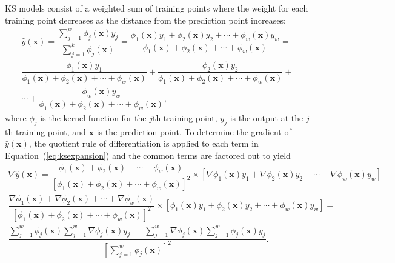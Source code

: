 \ac{KS} models consist of a weighted sum of training points where the weight for each training point decreases as the distance from the prediction point increases:
\begin{multline}
 \label{eq:ksexpansion}
	\hat{y}(\mathbf{x}) = \dfrac{\sum_{j=1}^{w} \phi_j(\mathbf{x})y_j}{\sum_{j=1}^{k} \phi_j(\mathbf{x})} =
	\dfrac{\phi_1(\mathbf{x}) y_1 + \phi_2(\mathbf{x}) y_2 +\cdots + \phi_w(\mathbf{x}) y_w}{\phi_1(\mathbf{x})+ \phi_2(\mathbf{x})+\cdots + \phi_w(\mathbf{x})} = \\
	\dfrac{\phi_1(\mathbf{x}) y_1}{\phi_1(\mathbf{x})+ \phi_2(\mathbf{x}) + \cdots + \phi_w(\mathbf{x})} + \dfrac{\phi_2(\mathbf{x}) y_2}{\phi_1(\mathbf{x})+ \phi_2(\mathbf{x})+\cdots + \phi_w(\mathbf{x})} + \\
	 \cdots + \dfrac{\phi_w(\mathbf{x}) y_w}{\phi_1(\mathbf{x})+ \phi_2(\mathbf{x})+\cdots + \phi_w(\mathbf{x})},
\end{multline}
where $\phi_j$ is the kernel function for the $j$th training point, $y_j$ is the output at the $j$th training point, and $\mathbf{x}$ is the prediction point. 
%
To determine the gradient of $\hat{y}(\mathbf{x})$, the quotient rule of differentiation is applied to each term in Equation~(\ref{eq:ksexpansion}) and the common terms are factored out to yield
\begin{multline}
\label{eq:jacobiancomponent}
\nabla\hat{y}(\mathbf{x}) = \dfrac{\phi_1(\mathbf{x})+ \phi_2(\mathbf{x})+\cdots + \phi_w(\mathbf{x})}{\left[\phi_1(\mathbf{x})+ \phi_2(\mathbf{x})+\cdots + \phi_w(\mathbf{x})\right]^2} \times
\left[\nabla\phi_1(\mathbf{x}) y_1 + \nabla\phi_2(\mathbf{x}) y_2 +\cdots + \nabla\phi_w(\mathbf{x}) y_w\right] - \\
\dfrac{\nabla\phi_1(\mathbf{x})+ \nabla\phi_2(\mathbf{x})+ \cdots + \nabla\phi_w(\mathbf{x})}{\left[\phi_1(\mathbf{x})+ \phi_2(\mathbf{x})+\cdots + \phi_w(\mathbf{x})\right]^2} \times
\left[\phi_1(\mathbf{x}) y_1 + \phi_2(\mathbf{x}) y_2 +\cdots + \phi_w(\mathbf{x}) y_w\right] =\\
	\dfrac{{\sum_{j=1}^{w} \phi_j(\mathbf{x})} {\sum_{j=1}^{w} \nabla\phi_j(\mathbf{x})y_j}~-~{{\sum_{j=1}^{w} \nabla\phi_j(\mathbf{x})}{\sum_{j=1}^{w} \phi_j(\mathbf{x})y_j}}}{\left[\sum_{j=1}^{w} \phi_j(\mathbf{x})\right]^2}.
\end{multline}

